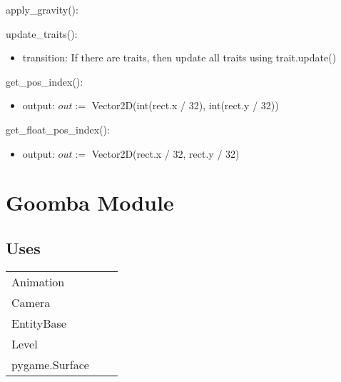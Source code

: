 \documentclass[12pt]{article}
\begin{document}
\noindent apply\_gravity():

\noindent update\_traits():
\begin{itemize}
    \item transition: If there are traits, then update all traits using trait.update()
\end{itemize}

\noindent get\_pos\_index():
\begin{itemize}
    \item output: $out := $ Vector2D(int(rect.x / 32), int(rect.y / 32))
\end{itemize}

\noindent get\_float\_pos\_index():
\begin{itemize}
    \item output: $out := $ Vector2D(rect.x / 32, rect.y / 32)
\end{itemize}

\newpage

\section*{Goomba Module}

\subsection* {Uses}

\begin{tabular}{lll}
    Animation & & \\
    Camera & & \\
    EntityBase & & \\
    Level & & \\
    pygame.Surface & & \\
\end{tabular}
\end{document}
